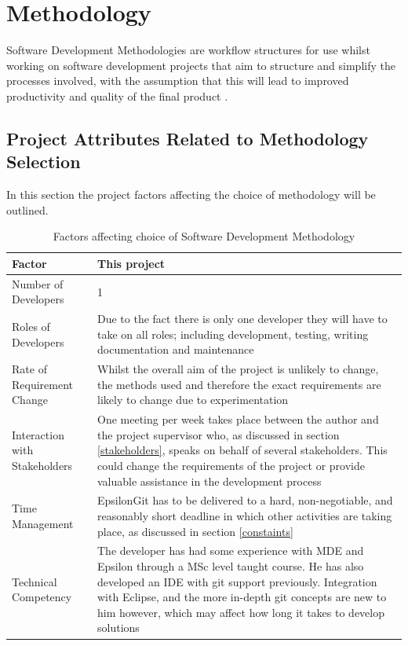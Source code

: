 \documentclass[11pt]{book}
\begin{document}
\chapter{Methodology}
Software Development Methodologies are workflow structures for use whilst working on software development projects that aim to structure and simplify the processes involved, with the assumption that this will lead to improved productivity and quality of the final product \cite{useofsystemdevelopmentmethodologies}.

\section{Project Attributes Related to Methodology Selection}
\vspace{-0.2cm}
In this section the project factors affecting the choice of methodology will be outlined.

\begin{table}[H]
\centering
\begin{longtable}{|p{5cm}|p{10cm}|}
\hline
\textbf{Factor} & \textbf{This project} \\ \hline
Number of Developers & 1 \\ \hline
Roles of Developers & Due to the fact there is only one developer they will have to take on all roles; including development, testing, writing documentation and maintenance \\ \hline
Rate of Requirement Change & Whilst the overall aim of the project is unlikely to change, the methods used and therefore the exact requirements are likely to change due to experimentation \\ \hline
Interaction with Stakeholders & One meeting per week takes place between the author and the project supervisor who, as discussed in section \ref{stakeholders}, speaks on behalf of several stakeholders. This could change the requirements of the project or provide valuable assistance in the development process \\ \hline
Time Management & EpsilonGit has to be delivered to a hard, non-negotiable, and reasonably short deadline in which other activities are taking place, as discussed in section \ref{constaints}  \\ \hline
Technical Competency & The developer has had some experience with MDE and Epsilon through a MSc level taught course. He has also developed an IDE with git support previously. Integration with Eclipse, and the more in-depth git concepts are new to him however, which may affect how long it takes to develop solutions \\ \hline
\end{longtable}
\caption{Factors affecting choice of Software Development Methodology}
\label{tab:methodologyfactors}
\end{table}
\end{document}
